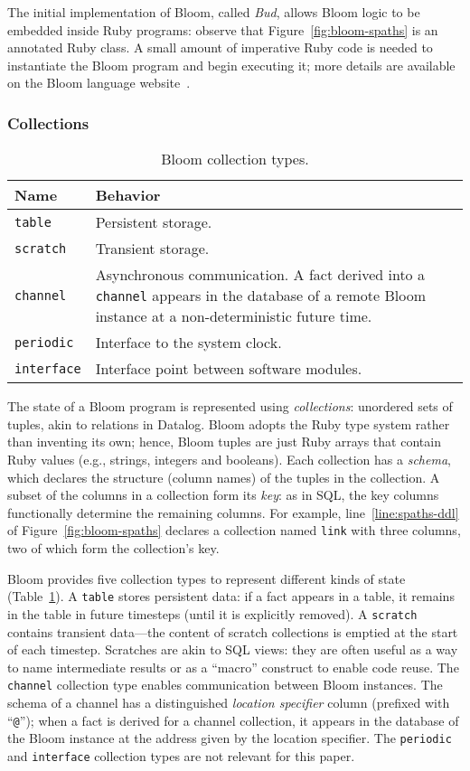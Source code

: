 The initial implementation of Bloom, called \emph{Bud}, allows Bloom logic to
be embedded inside Ruby programs: observe that Figure~\ref{fig:bloom-spaths} is
an annotated Ruby class. A small amount of imperative Ruby code is needed to
instantiate the Bloom program and begin executing it; more details are available
on the Bloom language website~\cite{bloom}.

\subsubsection{Collections}
\begin{table}[t]
\begin{tabular}{|l|p{2.32in}|}
\hline
\textbf{Name} & \textbf{Behavior }\\
\hline
\texttt{table} & Persistent storage.\\
\texttt{scratch} & Transient storage.\\
\texttt{channel} & Asynchronous communication. A fact derived into a \texttt{channel} appears in the
database of a remote Bloom instance at a non-deterministic future time.\\
\texttt{periodic} & Interface to the system clock.\\
\texttt{interface} & Interface point between software modules.\\
\hline
\end{tabular}
\caption{Bloom collection types.}
\label{tbl:bloom-collections}
\end{table}

The state of a Bloom program is represented using \emph{collections}: unordered
sets of tuples, akin to relations in Datalog. Bloom adopts the Ruby type system
rather than inventing its own; hence, Bloom tuples are just Ruby arrays that
contain Ruby values (e.g., strings, integers and booleans). Each collection has
a \emph{schema}, which declares the structure (column names) of the tuples in
the collection. A subset of the columns in a collection form its \emph{key}: as
in SQL, the key columns functionally determine the remaining columns. For
example, line~\ref{line:spaths-ddl} of Figure~\ref{fig:bloom-spaths} declares a
collection named \texttt{link} with three columns, two of which form the
collection's key.

Bloom provides five collection types to represent different kinds of state
(Table~\ref{tbl:bloom-collections}). A \texttt{table} stores persistent data: if
a fact appears in a table, it remains in the table in future timesteps (until it
is explicitly removed). A \texttt{scratch} contains transient data---the content
of scratch collections is emptied at the start of each timestep. Scratches are
akin to SQL views: they are often useful as a way to name intermediate results
or as a ``macro'' construct to enable code reuse. The \texttt{channel}
collection type enables communication between Bloom instances. The schema of a
channel has a distinguished \emph{location specifier} column (prefixed with
``\texttt{@}''); when a fact is derived for a channel collection, it appears in
the database of the Bloom instance at the address given by the location
specifier. The \texttt{periodic} and \texttt{interface} collection types are not
relevant for this paper.

